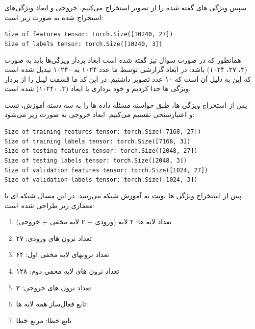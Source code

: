 \begin{qsolve}
	سپس ویژگی های گفته شده را از تصویر استخراج می‌کنیم. خروجی و ابعاد ویژگی‌های استخراج شده به صورت زیر است:
	
	\begin{latin}
		\texttt{Size of features tensor: torch.Size([10240, 27])}\\
		\texttt{Size of labels tensor: torch.Size([10240, 3])}
	\end{latin}
	همانطور که در صورت سوال نیز گفته شده است ابعاد بردار ویژگی‌ها باید به صورت (۳، ۲۷، ۱۰۲۴) باشد. در ابعاد گزارشی توسط ما عدد ۱۰۲۴ به ۱۰۲۴۰ تبدیل شده است که این به دلیل آن است که ۱۰ عدد تصویر داشتیم. در این کد ما قسمت لیبل را از بردار ویژگی ها جدا کردیم و خود برداری با ابعاد (۳، ۱۰۲۴۰) شده است.
	
	پس از استخراج ویژگی ها، طبق خواسته مسئله داده ها را به سه دسته آموزش، تست و اعتبارسنجی تقسیم می‌کنیم. ابعاد خروجی به صورت زیر می‌شود:
	
	\begin{latin}
		\texttt{Size of training features tensor: torch.Size([7168, 27])} \\
		\texttt{Size of training labels tensor: torch.Size([7168, 3])} \\
		\texttt{Size of testing features tensor: torch.Size([2048, 27])} \\
		\texttt{Size of testing labels tensor: torch.Size([2048, 3])} \\
		\texttt{Size of validation features tensor: torch.Size([1024, 27])} \\
		\texttt{Size of validation labels tensor: torch.Size([1024, 3])} \\
	\end{latin}
	
	پس از استخراج ویژگی ها نوبت به آموزش شبکه می‌رسد. در این مسال شبکه ای با معماری زیر طراحی شده است:
	
	\begin{enumerate}
		\item تعداد لایه ها: ۴ لایه (ورودی + ۲ لایه مخفی + خروجی)
		\item تعداد نرون های ورودی: ۲۷
		\item تعداد نرونهای لایه مخفی اول:‌ ۶۴
		\item تعداد نرون های لایه مخفی دوم: ۱۲۸
		\item تعداد نرون های خروجی: ۳
		\item تابع فعال‌ساز همه لایه ها: 
		\item تابع خطا: مربع خطا
	\end{enumerate}
	

\end{qsolve}
